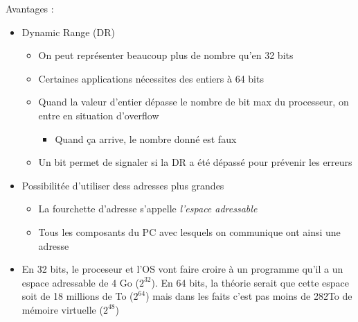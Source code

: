 \documentclass[a4paper]{article}
\begin{document}
  Avantages :
  \begin{itemize}
    \item Dynamic Range (DR)
    \begin{itemize}
      \item On peut représenter beaucoup plus de nombre qu'en 32 bits
      \item Certaines applications nécessites des entiers à 64 bits
      \item Quand la valeur d'entier dépasse le nombre de bit max du processeur, on entre en situation d'overflow
      \begin{itemize}
        \item Quand ça arrive, le nombre donné est faux
      \end{itemize}
    \item Un bit permet de signaler si la DR a été dépassé pour prévenir les erreurs
    \end{itemize}
    
    \item Possibilitée d'utiliser dess adresses plus grandes
    \begin{itemize}
      \item La fourchette d'adresse s'appelle \emph{l'espace adressable}
      \item Tous les composants du PC avec lesquels on communique ont ainsi une adresse
    \end{itemize}

    \item En 32 bits, le proceseur et l'OS vont faire croire à un programme qu'il a un espace adressable de 4 Go ($2^{32}$). En 64 bits, 
    la théorie serait que cette espace soit de 18 millions de To ($2^{64}$) mais dans les faits c'est pas moins de 282To de mémoire virtuelle ($2^{48}$)
  \end{itemize}

  \tableofcontents
\end{document}
